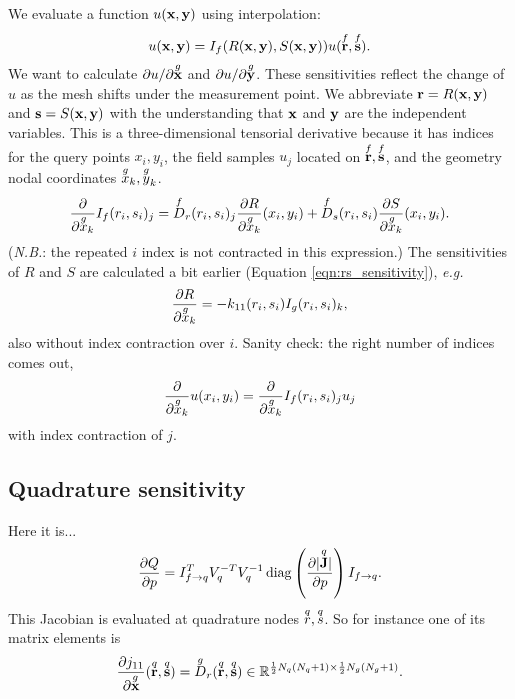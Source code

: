 We evaluate a function $u(\textbf{x}, \textbf{y})$ using interpolation:
%
\begin{equation}
u(\textbf{x}, \textbf{y}) = I_f(R(\textbf{x}, \textbf{y}), S(\textbf{x}, \textbf{y})) u(\overset{f}{\textbf{r}}, \overset{f}{\textbf{s}}).
\end{equation}
%
We want to calculate $\partial{u}/\partial{\overset{g}{\textbf{x}}}$ and $\partial{u}/\partial{\overset{g}{\textbf{y}}}$.  These sensitivities reflect the change of $u$ as the mesh shifts under the measurement point.  We abbreviate $\textbf{r} = R(\textbf{x}, \textbf{y})$ and $\textbf{s} = S(\textbf{x}, \textbf{y})$ with the understanding that $\textbf{x}$ and $\textbf{y}$ are the independent variables.  This is a three-dimensional tensorial derivative because it has indices for the query points $x_i, y_i$, the field samples $u_j$ located on $\overset{f}{\textbf{r}}, \overset{f}{\textbf{s}}$, and the geometry nodal coordinates $\overset{g}{x}_k, \overset{g}{y}_k$.
%
\begin{equation}
\frac{\partial{}}{\partial{\overset{g}{x}_k}} I_f(r_i, s_i)_j = \overset{f}{D}_r(r_i, s_i)_j \frac{\partial{R}}{\partial{\overset{g}{x}_k}}(x_i, y_i) + \overset{f}{D}_s(r_i, s_i) \frac{\partial{S}}{\partial{\overset{g}{x}_k}}(x_i, y_i).
\end{equation}
%
(\emph{N.B.}: the repeated $i$ index is not contracted in this expression.)  The sensitivities of $R$ and $S$ are calculated a bit earlier (Equation \ref{eqn:rs_sensitivity}), \emph{e.g.}
%
\begin{equation}
\frac{\partial{R}}{\partial{\overset{g}{x}_k}} = -k_{11}(r_i, s_i) I_g(r_i, s_i)_k,
\end{equation}
%
also without index contraction over $i$.  Sanity check: the right number of indices comes out,
%
\begin{equation}
\frac{\partial{}}{\partial{\overset{g}{x}_k}}u(x_i, y_i) = \frac{\partial{}}{\partial{\overset{g}{x}_k}} I_f(r_i, s_i)_j u_j
\end{equation}
%
with index contraction of $j$.


\subsection{Quadrature sensitivity}

Here it is...
%
\begin{equation}
\frac{\partial{Q}}{\partial{p}} = I_{f \rightarrow q}^T V_q^{-T} V_q^{-1} \operatorname{diag} \left(  \frac{\partial{| \overset{q}{\textbf{J}} |}}{\partial{p}} \right) I_{f \rightarrow q}.
\end{equation}
%
This Jacobian is evaluated at quadrature nodes $\overset{q}{r}, \overset{q}{s}$.  So for instance one of its matrix elements is
%
\begin{equation}
\frac{\partial{j_{11}}}{\partial{\overset{g}{\textbf{x}}}}(\overset{q}{\textbf{r}}, \overset{q}{\textbf{s}}) = \overset{g}{D}_r(\overset{q}{\textbf{r}}, \overset{q}{\textbf{s}}) \in \mathbb{R}^{\frac{1}{2}N_q(N_q+1) \times \frac{1}{2}N_g(N_g+1)}.
\end{equation}









